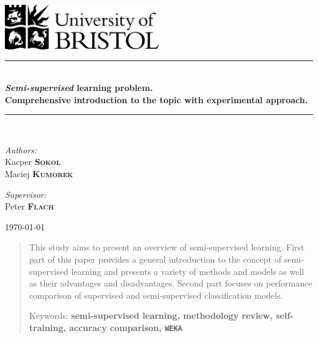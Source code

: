 \documentclass[12pt, a4paper, pdflatex]{report}
\newcommand{\HRule}{\rule{\linewidth}{0.5mm}}
\begin{document}
\begin{titlepage}
\begin{center}
\includegraphics[width=0.5\textwidth]{graphics/UOB-logo.png}~\\[4cm] %



\HRule \\[0.4cm]
{ \huge \bfseries \emph{Semi-supervised} learning problem.\\
	Comprehensive introduction to the topic with experimental approach.\\[0.4cm] }
\HRule \\[1.5cm]

\begin{minipage}{0.4\textwidth}
\begin{flushleft} \large
\emph{Authors:}\\
Kacper \textsc{\textbf{Sokol}} \\
Maciej \textsc{\textbf{Kumorek}}
\end{flushleft}
\end{minipage}
\begin{minipage}{0.4\textwidth}
\begin{flushright} \large
\emph{Supervisor:} \\
Peter \textsc{\textbf{Flach}}
\end{flushright}
\end{minipage}

\vfill

{\large \today}
\end{center}
\end{titlepage}

{

\onecolumn
}

\begin{abstract}
This study aims to present an overview of semi-supervised learning. First part of this paper provides a general introduction to the concept of semi-supervised learning and presents a variety of methods and models as well as their advantages and disadvantages. Second part focuses on performance comparison of supervised and semi-supervised classification models.
\begin{center}
Keywords: \textbf{semi-supervised learning, methodology review, self-training, accuracy comparison, \texttt{WEKA}}
\end{center}
\end{abstract}
\end{document}
